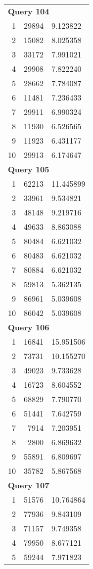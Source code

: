 \begin{longtable}[{p}]{@{}rrp{}@{}}
\midrule
\multicolumn{3}{l}{\bfseries Query 104} \\
1 & 29894 & 9.123822 \\
2 & 15082 & 8.025358 \\
3 & 33172 & 7.991021 \\
4 & 29908 & 7.822240 \\
5 & 28662 & 7.784087 \\
6 & 11481 & 7.236433 \\
7 & 29911 & 6.990324 \\
8 & 11930 & 6.526565 \\
9 & 11923 & 6.431177 \\
10 & 29913 & 6.174647 \\
\midrule
\multicolumn{3}{l}{\bfseries Query 105} \\
1 & 62213 & 11.445899 \\
2 & 33961 & 9.534821 \\
3 & 48148 & 9.219716 \\
4 & 49633 & 8.863088 \\
5 & 80484 & 6.621032 \\
6 & 80483 & 6.621032 \\
7 & 80884 & 6.621032 \\
8 & 59813 & 5.362135 \\
9 & 86961 & 5.039608 \\
10 & 86042 & 5.039608 \\
\midrule
\multicolumn{3}{l}{\bfseries Query 106} \\
1 & 16841 & 15.951506 \\
2 & 73731 & 10.155270 \\
3 & 49023 & 9.733628 \\
4 & 16723 & 8.604552 \\
5 & 68829 & 7.790770 \\
6 & 51441 & 7.642759 \\
7 & 7914 & 7.203951 \\
8 & 2800 & 6.869632 \\
9 & 55891 & 6.809697 \\
10 & 35782 & 5.867568 \\
\midrule
\multicolumn{3}{l}{\bfseries Query 107} \\
1 & 51576 & 10.764864 \\
2 & 77936 & 9.843109 \\
3 & 71157 & 9.749358 \\
4 & 79950 & 8.677121 \\
5 & 59244 & 7.971823 \\

\end{longtable}
